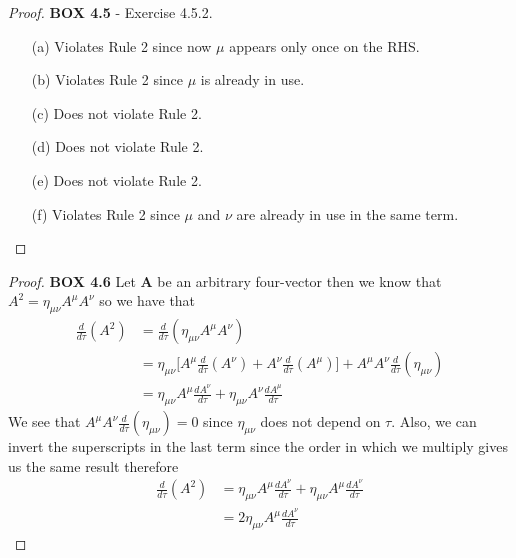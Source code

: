 \documentclass[11pt]{article}
\theoremstyle{definition}
\begin{document}
\begin{proof}{\textbf{BOX 4.5} - Exercise 4.5.2.}
    \begin{itemize}
        \item [(a)] Violates Rule 2 since now $\mu$ appears only once on the RHS.
        \item [(b)] Violates Rule 2 since $\mu$ is already in use.
        \item [(c)] Does not violate Rule 2.
        \item [(d)] Does not violate Rule 2.
        \item [(e)] Does not violate Rule 2.
        \item [(f)] Violates Rule 2 since $\mu$ and $\nu$ are already in use
        in the same term.
    \end{itemize}
\end{proof}
\begin{proof}{\textbf{BOX 4.6}}
    Let $\bm{A}$ be an arbitrary four-vector then we know that
    $A^2 = \eta_{\mu\nu}A^\mu A^\nu$ so we have that
    \begin{align*}
        \frac{d}{d\tau}(A^2) &= \frac{d}{d\tau}(\eta_{\mu\nu}A^\mu A^\nu)\\
            &= \eta_{\mu\nu}\bigg[
                A^\mu\frac{d}{d\tau}(A^\nu) + A^\nu\frac{d}{d\tau}(A^\mu)
            \bigg] + A^\mu A^\nu\frac{d}{d\tau}(\eta_{\mu\nu})\\
            &=\eta_{\mu\nu}A^\mu\frac{dA^\nu}{d\tau}
            + \eta_{\mu\nu}A^\nu\frac{dA^\mu}{d\tau}
        \end{align*}
    We see that $A^\mu A^\nu\frac{d}{d\tau}(\eta_{\mu\nu}) = 0$ since
    $\eta_{\mu\nu}$ does not depend on $\tau$.
    Also, we can invert the superscripts in the last term since the order in
    which we multiply gives us the same result therefore
    \begin{align*}
        \frac{d}{d\tau}(A^2)
        &=\eta_{\mu\nu}A^\mu\frac{dA^\nu}{d\tau}
        + \eta_{\mu\nu}A^\mu\frac{dA^\nu}{d\tau}\\
        &= 2\eta_{\mu\nu}A^\mu\frac{dA^\nu}{d\tau}
    \end{align*}
\end{proof}
\cleardoublepage
\end{document}
